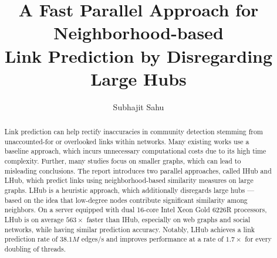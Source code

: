 \documentclass[sigconf,nonacm]{acmart}
\begin{document}
\title[A Fast Parallel Approach for Neighborhood-based Link Prediction by Disregarding Large Hubs]{A Fast Parallel Approach for Neighborhood-based \\Link Prediction by Disregarding Large Hubs}


\author{Subhajit Sahu}



\begin{abstract}
Link prediction can help rectify inaccuracies in community detection stemming from unaccounted-for or overlooked links within networks. Many existing works use a baseline approach, which incurs unnecessary computational costs due to its high time complexity. Further, many studies focus on smaller graphs, which can lead to misleading conclusions. The report introduces two parallel approaches, called IHub and LHub, which predict links using neighborhood-based similarity measures on large graphs. LHub is a heuristic approach, which additionally disregards large hubs --- based on the idea that low-degree nodes contribute significant similarity among neighbors. On a server equipped with dual 16-core Intel Xeon Gold 6226R processors, LHub is on average $563\times$ faster than IHub, especially on web graphs and social networks, while having similar prediction accuracy. Notably, LHub achieves a link prediction rate of $38.1M$ edges/s and improves performance at a rate of $1.7\times$ for every doubling of threads.
\end{abstract}

\end{document}
